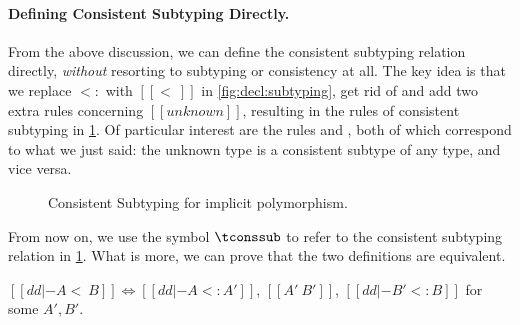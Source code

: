\paragraph{Defining Consistent Subtyping Directly.}

From the above discussion, we can define the consistent subtyping relation
directly, \emph{without} resorting to subtyping or consistency at all. The key
idea is that we replace $<:$ with $[[<~]]$ in
\cref{fig:decl:subtyping}, get rid of  and add two
extra rules concerning $[[unknown]]$, resulting in the rules of consistent
subtyping in \cref{fig:decl:conssub}. Of particular interest are the rules
 and , both of which correspond to what we
just said: the unknown type is a consistent subtype of any type, and vice versa.
\begin{figure}[t]
  \begin{small}
  \end{small}
  \caption{Consistent Subtyping for implicit polymorphism.}
  \label{fig:decl:conssub}
\end{figure}
From now on, we use the symbol $\tconssub$ to refer to the consistent subtyping
relation in \cref{fig:decl:conssub}. What is more, we can prove that the two definitions
are equivalent.

\begin{ctheorem}   \label{lemma:properties-conssub}
  $[[dd |- A <~ B]]  \Leftrightarrow [[ dd |- A <: A'  ]]$, $[[ A' ~ B' ]]$, $[[ dd |- B' <: B   ]]$ for some $A', B'$.
\end{ctheorem}







